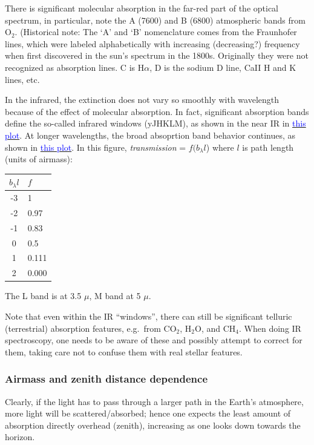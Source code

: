 \documentclass[12pt]{article}
\begin{document}
There is significant molecular absorption in the far-red part of the
optical spectrum, in particular, note the A (7600) and B (6800)
atmospheric bands from O$_2$.
(Historical note: The `A' and `B' nomenclature comes from the
Fraunhofer lines, which were labeled alphabetically with increasing
(decreasing?) frequency when first
discovered in the sun's spectrum in the 1800s. Originally they were
not recognized as absorption lines. C is H$\alpha$, D is the sodium D
line, CaII H and K lines, etc.

In the infrared, the extinction does not vary so smoothly with
wavelength because of the effect of molecular absorption. In fact,
significant absorption bands define the so-called infrared windows
(yJHKLM), as shown in the near IR in
\href{http://astronomy.nmsu.edu/holtz/a535/html/diagrams/a535/mandbell.htm}
{\textcolor{blue}{this plot}}.
At longer wavelengths,
the broad absoprtion band behavior continues, as shown in
\href{http://astronomy.nmsu.edu/holtz/a535/html/diagrams/a535/allen1.htm}
{\textcolor{blue}{this plot}}.
In this figure, \emph{transmission} = $f(b_{\lambda}l$) where $l$
is path length (units of airmass):

\begin{table}[h]
\centering
\begin{tabular}{c l}
$b_{\lambda}l$ & $f$\\
\hline\hline
-3  & 1\\
-2  & 0.97\\
-1  & 0.83\\
0   & 0.5\\
1   & 0.111\\
2   & 0.000\\
\hline
\end{tabular}
\end{table}

The L band is at 3.5 $\mu$, M band at 5 $\mu$.

Note that even within the IR ``windows'', there can still be
significant telluric (terrestrial) absorption features,
e.g.\ from CO$_2$, H$_2$O, and CH$_4$.
When doing IR spectroscopy, one needs to be aware of these and
possibly attempt to correct for them, taking care not to confuse them
with real stellar features.

\subsubsection{Airmass and zenith distance dependence}

Clearly, if the light has to pass through a larger path in the Earth's
atmosphere, more light will be scattered/absorbed; hence one expects
the least amount of absorption directly overhead (zenith), increasing
as one looks down towards the horizon.
\end{document}
